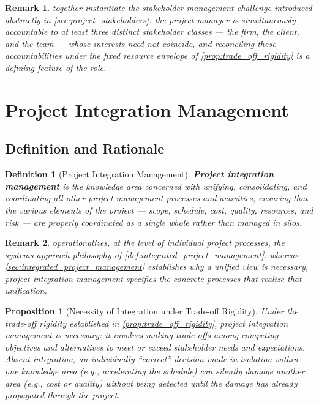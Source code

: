 \documentclass[12pt, a4paper]{report}
\theoremstyle{engnotes}
\newtheorem{prop}{Proposition}[section]
\newtheorem{defn}{Definition}[section]
\newtheorem{remark}{Remark}[section]
\begin{document}
\begin{remark}
     together instantiate the stakeholder-management challenge introduced abstractly in \cref{sec:project_stakeholders}: the project manager is simultaneously accountable to at least three distinct stakeholder classes --- the firm, the client, and the team --- whose interests need not coincide, and reconciling these accountabilities under the fixed resource envelope of \cref{prop:trade_off_rigidity} is a defining feature of the role.
\end{remark}

\section{Project Integration Management}
\label{sec:project_integration_management_processes}

\subsection{Definition and Rationale}
\label{subsec:pim_definition}

\begin{defn}[Project Integration Management]\label{def:project_integration_management}
    \textbf{Project integration management} is the knowledge area concerned with unifying, consolidating, and coordinating all other project management processes and activities, ensuring that the various elements of the project --- scope, schedule, cost, quality, resources, and risk --- are properly coordinated as a single whole rather than managed in silos.
\end{defn}

\begin{remark}
     operationalizes, at the level of individual project processes, the systems-approach philosophy of \cref{def:integrated_project_management}: whereas \cref{sec:integrated_project_management} establishes \emph{why} a unified view is necessary, project integration management specifies the concrete \emph{processes} that realize that unification.
\end{remark}

\begin{prop}[Necessity of Integration under Trade-off Rigidity]\label{prop:necessity_integration}
    Under the trade-off rigidity established in \cref{prop:trade_off_rigidity}, project integration management is necessary: it involves making trade-offs among competing objectives and alternatives to meet or exceed stakeholder needs and expectations. Absent integration, an individually ``correct'' decision made in isolation within one knowledge area (e.g., accelerating the schedule) can silently damage another area (e.g., cost or quality) without being detected until the damage has already propagated through the project.
\end{prop}
\end{document}
